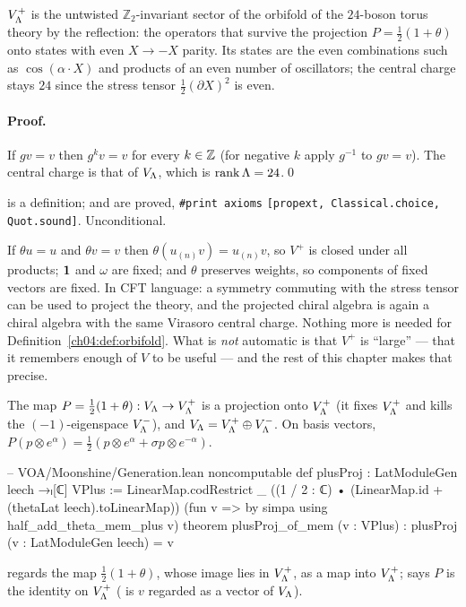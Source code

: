 \begin{physics}
$V_{\Lambda}^+$ is the untwisted $\mathbb Z_2$-invariant sector of the orbifold of the $24$-boson torus theory by the reflection: the operators that survive the projection $P=\tfrac12(1+\theta)$ onto states with even $X\to-X$ parity. Its states are the even combinations such as $\cos(\alpha\cdot X)$ and products of an even number of oscillators; the central charge stays $24$ since the stress tensor $\tfrac12(\partial X)^2$ is even.
\end{physics}

\paragraph{Proof.} If $gv=v$ then $g^kv=v$ for every $k\in{\mathbb{Z}}$ (for negative $k$ apply $g^{-1}$ to
$gv=v$). The central charge is that of $V_{\Lambda}$, which is $\operatorname{rank}{\Lambda}=24$.\qed

\begin{status}
 is a definition;  and
 are proved, \texttt{\#print axioms}
\texttt{[propext, Classical.choice, Quot.sound]}. Unconditional.
\end{status}

\begin{remark}
If $\theta u=u$ and $\theta v=v$ then $\theta(u_{(n)}v)=u_{(n)}v$, so $V^+$ is closed under all
products; $\mathbf{1}$ and $\omega$ are fixed; and $\theta$ preserves weights, so components of fixed
vectors are fixed. In CFT language: a symmetry commuting with the stress tensor can be used to
project the theory, and the projected chiral algebra is again a chiral algebra with the same
Virasoro central charge. Nothing more is needed for Definition~\ref{ch04:def:orbifold}. What is
\emph{not} automatic is that $V^+$ is ``large'' --- that it remembers enough of $V$ to be useful
--- and the rest of this chapter makes that precise.
\end{remark}

\begin{remark}\label{ch04:rem:proj}
The map $P=\tfrac12(1+\theta):V_{\Lambda}\to V_{\Lambda}^+$ is a projection onto $V_{\Lambda}^+$ (it fixes
$V_{\Lambda}^+$ and kills the $(-1)$-eigenspace $V_{\Lambda}^-$), and $V_{\Lambda}=V_{\Lambda}^+\oplus V_{\Lambda}^-$. On
basis vectors, $P(p\otimes e^\alpha)=\tfrac12(p\otimes e^\alpha+\sigma p\otimes e^{-\alpha})$.
\begin{leancode}
-- VOA/Moonshine/Generation.lean
noncomputable def plusProj : LatModuleGen leech →ₗ[ℂ] VPlus :=
  LinearMap.codRestrict _ ((1 / 2 : ℂ) • (LinearMap.id + (thetaLat leech).toLinearMap))
    (fun v => by simpa using half_add_theta_mem_plus v)
theorem plusProj_of_mem (v : VPlus) : plusProj (v : LatModuleGen leech) = v
\end{leancode}
 regards the map $\tfrac12(1+\theta)$, whose image lies in $V_{\Lambda}^+$,
as a map into $V_{\Lambda}^+$;  says $P$ is the identity on $V_{\Lambda}^+$
( is $v$ regarded as a vector of $V_{\Lambda}$).
\end{remark}

